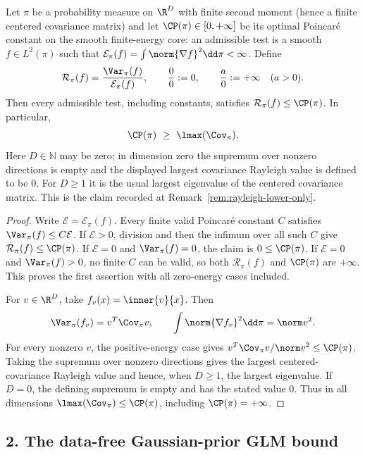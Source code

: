 \documentclass[../main.tex]{subfiles}
\begin{document}
\begin{lemma}
\label{lem:sol-linear-test-lower}
Let \(\pi\) be a probability measure on \(\R^D\) with finite second moment (hence a finite
centered covariance matrix) and let
\(\CP(\pi)\in[0,+\infty]\) be its optimal Poincar\'e constant on the smooth finite-energy
core: an admissible test is a smooth \(f\in L^2(\pi)\) such that
\(\mathcal E_\pi(f)=\int\norm{\nabla f}^2\dd\pi<\infty\).  Define
\[
 \mathcal R_\pi(f)=\frac{\Var_\pi(f)}{\mathcal E_\pi(f)},
 \qquad \frac00:=0,\qquad \frac a0:=+\infty\quad(a>0).
\]
Then every admissible test, including constants, satisfies
\(\mathcal R_\pi(f)\le\CP(\pi)\).  In particular,
\[
 \CP(\pi)\ \ge\ \lmax(\Cov_\pi).
\]
Here \(D\in\mathbb N\) may be zero; in dimension zero the supremum over nonzero directions is empty and
the displayed largest covariance Rayleigh value is defined to be \(0\).  For \(D\ge1\) it is the
usual largest eigenvalue of the centered covariance matrix.
This is the claim recorded at Remark~\ref{rem:rayleigh-lower-only}.
\end{lemma}

\begin{proof}
Write \(\mathcal E=\mathcal E_\pi(f)\).  Every finite valid Poincar\'e constant \(C\) satisfies
\(\Var_\pi(f)\le C\mathcal E\).  If \(\mathcal E>0\), division and then the infimum over all such
\(C\) give \(\mathcal R_\pi(f)\le\CP(\pi)\).  If \(\mathcal E=0\) and
\(\Var_\pi(f)=0\), the claim is \(0\le\CP(\pi)\).  If \(\mathcal E=0\) and
\(\Var_\pi(f)>0\), no finite \(C\) can be valid, so both
\(\mathcal R_\pi(f)\) and \(\CP(\pi)\) are \(+\infty\).  This proves the first assertion with all
zero-energy cases included.

For \(v\in\R^D\), take
\(f_v(x)=\inner{v}{x}\).  Then
\[
 \Var_\pi(f_v)=v^T\Cov_\pi v,
 \qquad
 \int\norm{\nabla f_v}^2\dd\pi=\norm v^2.
\]
For every nonzero \(v\), the positive-energy case gives
\(v^T\Cov_\pi v/\norm v^2\le\CP(\pi)\).  Taking the supremum over nonzero directions gives the
largest centered-covariance Rayleigh value and hence, when \(D\ge1\), the largest eigenvalue.  If
\(D=0\), the defining supremum is empty and has the stated value \(0\).  Thus in all dimensions
\(\lmax(\Cov_\pi)\le\CP(\pi)\), including \(\CP(\pi)=+\infty\).
\end{proof}

\subsection*{2. The data-free Gaussian-prior GLM bound}
\end{document}
